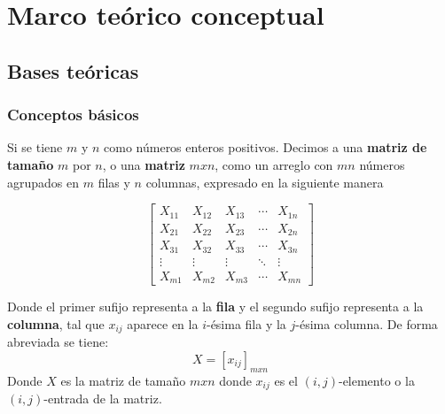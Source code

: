 \section{Marco teórico conceptual}


%


\subsection{Bases teóricas}
\subsubsection{Conceptos básicos }

\begin{defi}\citep{Blyth_2002}
    Si se tiene $m$ y $n$ como números enteros positivos. Decimos a una \textbf{matriz de tamaño} $m$ por $n$, o una \textbf{matriz} $mxn$, como un arreglo con $mn$ números agrupados en $m$ filas y $n$ columnas, expresado en la siguiente manera

    $$
    \begin{bmatrix}
        X_{11} & X_{12} & X_{13} & \cdots & X_{1n} \\
        X_{21} & X_{22} & X_{23} & \cdots & X_{2n} \\
        X_{31} & X_{32} & X_{33} & \cdots & X_{3n} \\
        \vdots & \vdots & \vdots & \ddots & \vdots \\
        X_{m1} & X_{m2} & X_{m3} & \cdots & X_{mn}
    \end{bmatrix}
    $$

    Donde el primer sufijo representa a la \textbf{fila} y el segundo sufijo representa a la \textbf{columna}, tal que $x_{ij}$ aparece en la $i$-\'esima fila y la $j$-\'esima columna. De forma abreviada se tiene:
    $$X={\left[x_{ij} \right]}_{mxn}$$
    Donde $X$ es la matriz de tamaño $mxn$  donde $x_{ij}$ es el $(i,j)$-elemento o la $(i,j)$-entrada de la matriz.

\end{defi}

